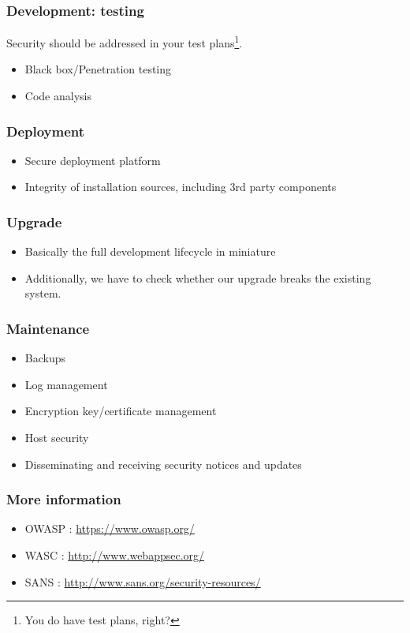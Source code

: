 \documentclass[10pt]{beamer}
\begin{document}
\begin{frame}
  \frametitle{Development: testing}

  Security should be addressed in your test plans\footnote{You do have test plans, right?}.

 \begin{itemize}
  \item Black box/Penetration testing
  \item Code analysis
  \end{itemize}
\end{frame}


\begin{frame}
  \frametitle{Deployment}

 \begin{itemize}
  \item Secure deployment platform
  \item Integrity of installation sources, including 3rd party components
  \end{itemize}
\end{frame}


\begin{frame}
  \frametitle{Upgrade}

 \begin{itemize}
  \item Basically the full development lifecycle in miniature
  \item Additionally, we have to check whether our upgrade breaks
	  the existing system.
  \end{itemize}
\end{frame}



\begin{frame}
  \frametitle{Maintenance}

 \begin{itemize}
  \item Backups
  \item Log management
  \item Encryption key/certificate management
  \item Host security
  \item Disseminating and receiving security notices and updates
  \end{itemize}
\end{frame}


\begin{frame}
  \frametitle{More information}

 \begin{itemize}
	 \item OWASP :  \url{https://www.owasp.org/ }
	 \item WASC  :  \url{http://www.webappsec.org/}
	 \item SANS  :  \url{http://www.sans.org/security-resources/}
  \end{itemize}
\end{frame}
\end{document}
